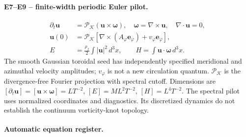 \documentclass[10pt,a4paper]{article}
\newcommand{\rhoF}{\rho_{\!f}}
\begin{document}
\paragraph{E7--E9 -- finite-width periodic Euler pilot.}
\begin{align}
\partial_t\mathbf u&=\mathcal P_{\mathcal K}(\mathbf u\times\boldsymbol\omega),\quad
\boldsymbol\omega=\nabla\times\mathbf u,\quad\nabla\cdot\mathbf u=0,\\
\mathbf u(0)&=\mathcal P_{\mathcal K}\left[\nabla\times(A_{\varphi}\mathbf e_{\varphi})+v_{\varphi}\mathbf e_{\varphi}\right],\\
E&=\frac{\rhoF}{2}\int |\mathbf u|^2\,d^3x,\qquad
H=\int\mathbf u\cdot\boldsymbol\omega\,d^3x.
\end{align}
The smooth Gaussian toroidal seed has independently specified meridional and azimuthal velocity amplitudes; $v_\varphi$ is not a new circulation quantum. $\mathcal P_{\mathcal K}$ is the divergence-free Fourier projection with spectral cutoff. Dimensions are $[\partial_t\mathbf u]=[\mathbf u\times\boldsymbol\omega]=LT^{-2}$, $[E]=ML^2T^{-2}$, $[H]=L^4T^{-2}$. The spectral pilot uses normalized coordinates and diagnostics. Its discretized dynamics do not establish the continuum vorticity-knot topology.
\paragraph{Automatic equation register.}

\end{document}
